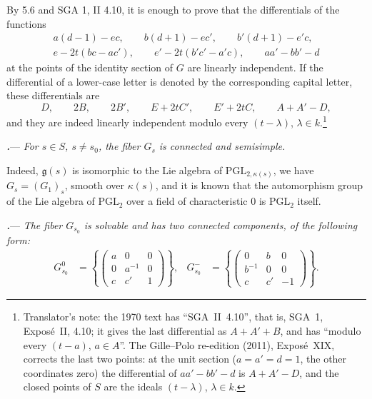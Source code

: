 By 5.6 and SGA 1, II 4.10, it is enough to prove that the
differentials of the functions
\[
\begin{gathered}
  a(d-1)-ec,\qquad
  b(d+1)-ec',\qquad
  b'(d+1)-e'c,\\
  e-2t(bc-ac'),\qquad
  e'-2t(b'c'-a'c),\qquad
  aa'-bb'-d
\end{gathered}
\]
at the points of the identity section of \(G\) are linearly
independent.  If the differential of a lower-case letter is denoted
by the corresponding capital letter, these differentials are
\[
  D,\qquad
  2B,\qquad
  2B',\qquad
  E+2tC',\qquad
  E'+2tC,\qquad
  A+A'-D,
\]
and they are indeed linearly independent modulo every
\((t-\lambda)\), \(\lambda\in k\).\footnote{Translator's note: the 1970 text has ``SGA~II~4.10'', that is,
SGA~1, Exposé~II, 4.10; it gives the last differential as \(A+A'+B\), and has
``modulo every \((t-a)\), \(a\in A\)''. The Gille--Polo re-edition (2011),
Exposé~XIX, corrects the last two points: at the unit section (\(a=a'=d=1\),
the other coordinates zero) the differential of \(aa'-bb'-d\) is \(A+A'-D\),
and the closed points of \(S\) are the ideals \((t-\lambda)\),
\(\lambda\in k\).}

\par\medskip\noindent
\textbf{\textit{.}}---
\textit{For \(s\in S\), \(s\ne s_0\), the fiber \(G_s\) is connected
and semisimple.}

Indeed, \(\mathfrak g(s)\) is isomorphic to the Lie algebra of
\(\mathrm{PGL}_{2,\kappa(s)}\), we have \(G_s=(G_1)_s\), smooth over
\(\kappa(s)\), and it is known that the automorphism group of the Lie algebra
of \(\mathrm{PGL}_2\) over a field of characteristic \(0\) is
\(\mathrm{PGL}_2\) itself.

\par\medskip\noindent
\textbf{\textit{.}}---
\textit{The fiber \(G_{s_0}\) is solvable and has two connected
components, of the following form:}
\[
\begin{aligned}
  G^0_{s_0}
  &=
  \left\{
  \begin{pmatrix}
    a&0&0\\
    0&a^{-1}&0\\
    c&c'&1
  \end{pmatrix}
  \right\},
  &
  G^-_{s_0}
  &=
  \left\{
  \begin{pmatrix}
    0&b&0\\
    b^{-1}&0&0\\
    c&c'&-1
  \end{pmatrix}
  \right\}.
\end{aligned}
\]

